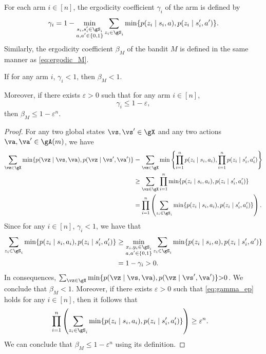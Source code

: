 \begin{thm}
    For each arm $i\in[n]$, the ergodicity coefficient $\gamma_i$ of the arm is defined by
    \begin{align*}
        \gamma_i = 1-\min_{\substack{s_i,s'_i\in\gS_i \\a,a'\in\{0,1\}}} \sum_{z_i\in\gS_i} \min\{p(z_i \mid s_i, a), p(z_i \mid s'_i, a')\}.
    \end{align*}
    Similarly, the ergodicity coefficient $\beta_M$ of the bandit $M$ is defined in the same manner as \eqref{eq:ergodic_M}.

    If for any arm $i$, $\gamma_i<1$, then $\beta_M<1$.

    Moreover, if there exists $\varepsilon>0$ such that for any arm $i\in[n]$,
    \begin{equation}
        \label{eq:gamma_ep}
        \gamma_i \le 1-\varepsilon,
    \end{equation}
    then $\beta_M \le 1-\varepsilon^n$.
    \label{thm:ergodicity_coeff}
\end{thm}
\begin{proof}
    For any two global states $\vs,\vs'\in\gX$ and any two actions $\va,\va'\in\gA(m)$, we have
    \begin{align*}
        \sum_{\vz\in\gX} \min\{p(\vz \mid \vs, \va), p(\vz \mid \vs', \va')\}
        &= \sum_{\vz\in\gX} \min\left\{\prod_{i=1}^np(z_i \mid s_i, a_i), \prod_{i=1}^np(z_i \mid s'_i, a'_i)\right\} \\
        &\ge \sum_{\vz\in\gX}\prod_{i=1}^n \min\{p(z_i \mid s_i, a_i), p(z_i \mid s'_i, a'_i)\} \\
        &= \prod_{i=1}^n \left(\sum_{z_i\in\gS_i} \min\{p(z_i \mid s_i, a_i), p(z_i \mid s'_i, a'_i)\}\right).
    \end{align*}
    Since for any $i\in[n]$, $\gamma_i<1$, we have that
    \begin{align*}
        \sum_{z_i\in\gS_i} \min\{p(z_i \mid s_i, a_i), p(z_i \mid s'_i, a'_i)\}
        &\ge \min_{\substack{x_i,y_i\in\gS_i \\a,a'\in\{0,1\}}} \sum_{z_i\in\gS_i} \min\{p(z_i \mid s_i, a), p(z_i \mid s'_i, a')\} \\
        &= 1-\gamma_i >0.
    \end{align*}
    In consequences, ${\sum_{\vz\in\gX} \min\{p(\vz \mid \vs, \va), p(\vz \mid \vs', \va')\}{>}0}$.
    We conclude that $\beta_M{<}1$.
    \smallskip
    Moreover, if there exists $\varepsilon>0$ such that \eqref{eq:gamma_ep} holds for any $i\in[n]$, then it follows that
    \begin{align*}
        \prod_{i=1}^n \left(\sum_{z_i\in\gS_i} \min\{p(z_i \mid s_i, a_i), p(z_i \mid s'_i, a'_i)\}\right)
        &\ge \varepsilon^n.
    \end{align*}
    We can conclude that $\beta_M\le 1-\varepsilon^n$ using its definition.
\end{proof}

